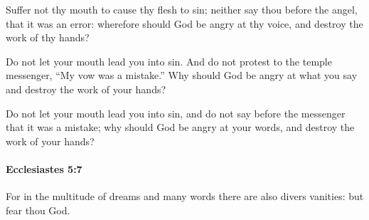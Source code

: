 			\begin{versebox}
					\item[BHS] 
					\item[LXX] 
					\item[ASV] Suffer not thy mouth to cause thy flesh to sin; neither say thou before the angel, that it was an error: wherefore should God be angry at thy voice, and destroy the work of thy hands?
					\item[NIV] Do not let your mouth lead you into sin. And do not protest to the temple messenger, “My vow was a mistake.” Why should God be angry at what you say and destroy the work of your hands?
					\item[NRSV] Do not let your mouth lead you into sin, and do not say before the messenger that it was a mistake; why should God be angry at your words, and destroy the work of your hands?
			\end{versebox}

		\paragraph{Ecclesiastes 5:7} %
			\label{ECCLESIASTES-5-7}

			For in the multitude of dreams and many words there are also divers vanities: but fear thou God.

